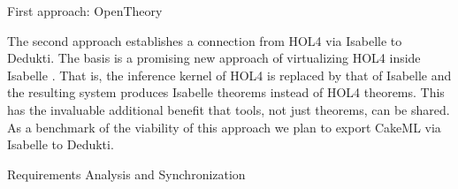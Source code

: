 \begin{workpackage}[id=libraries,wphases=0-48,type=RTD,
  short=Libraries,%
  title=Libraries,
  lead=Inr,
  InrRM=10,
  TumRM=24]
\begin{tasklist}
\begin{task}[id=cakeml,title=The CakeML programming language library]
First approach: OpenTheory

The second approach establishes a connection from HOL4 via Isabelle to
Dedukti. The basis is a promising new approach of virtualizing HOL4
inside Isabelle \cite{ImmlerRaedleWenzel}. That is, the inference
kernel of HOL4 is replaced by that of Isabelle and the resulting
system produces Isabelle theorems instead of HOL4 theorems. This has
the invaluable additional benefit that tools, not just theorems, can
be shared. As a benchmark of the viability of this approach we plan to
export CakeML via Isabelle to Dedukti.
\end{task}

\begin{task}[id=unimath,title=The UniMath library]
\end{task}


\end{tasklist}

\begin{wpdelivs}
  \begin{wpdeliv}[due=3,miles=startup,id=requirements,dissem=PU,nature=DEM,lead=Inr]
      {Requirements Analysis and Synchronization}
\end{wpdeliv}
\end{wpdelivs}
\end{workpackage}

